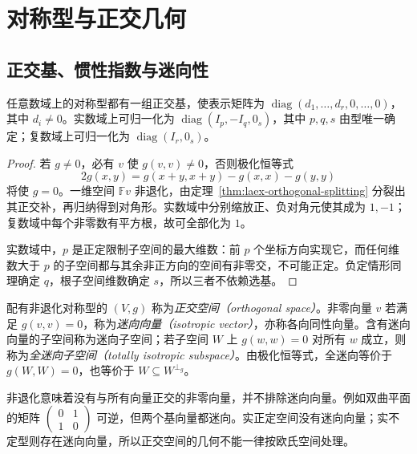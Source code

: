 \section{对称型与正交几何}
\label{sec:laex-orthogonal-geometry}

\subsection{正交基、惯性指数与迷向性}

\begin{theorem}
\label{thm:laex-symmetric-normal}
任意数域上的对称型都有一组正交基，使表示矩阵为 $\operatorname{diag}(d_1,\ldots,d_r,0,\ldots,0)$，其中 $d_i\ne0$。实数域上可归一化为 $\operatorname{diag}(I_p,-I_q,0_s)$，其中 $p,q,s$ 由型唯一确定；复数域上可归一化为 $\operatorname{diag}(I_r,0_s)$。
\end{theorem}
\begin{proof}
若 $g\ne0$，必有 $v$ 使 $g(v,v)\ne0$，否则极化恒等式
\[
 2g(x,y)=g(x+y,x+y)-g(x,x)-g(y,y)
\]
将使 $g=0$。一维空间 $\mathbb Fv$ 非退化，由定理~\ref{thm:laex-orthogonal-splitting} 分裂出其正交补，再归纳得到对角形。实数域中分别缩放正、负对角元使其成为 $1,-1$；复数域中每个非零数有平方根，故可全部化为 $1$。

实数域中，$p$ 是正定限制子空间的最大维数：前 $p$ 个坐标方向实现它，而任何维数大于 $p$ 的子空间都与其余非正方向的空间有非零交，不可能正定。负定情形同理确定 $q$，根子空间维数确定 $s$，所以三者不依赖选基。
\end{proof}

\begin{definition}
配有非退化对称型的 $(V,g)$ 称为\emph{正交空间（orthogonal space）}。非零向量 $v$ 若满足 $g(v,v)=0$，称为\emph{迷向向量（isotropic vector）}，亦称各向同性向量。含有迷向向量的子空间称为迷向子空间；若子空间 $W$ 上 $g(w,w)=0$ 对所有 $w$ 成立，则称为\emph{全迷向子空间（totally isotropic subspace）}。由极化恒等式，全迷向等价于 $g(W,W)=0$，也等价于 $W\subseteq W^{\perp_g}$。
\end{definition}

非退化意味着没有与所有向量正交的非零向量，并不排除迷向向量。例如双曲平面的矩阵 $\begin{pmatrix}0&1\\1&0\end{pmatrix}$ 可逆，但两个基向量都迷向。实正定空间没有迷向向量；实不定型则存在迷向向量，所以正交空间的几何不能一律按欧氏空间处理。

